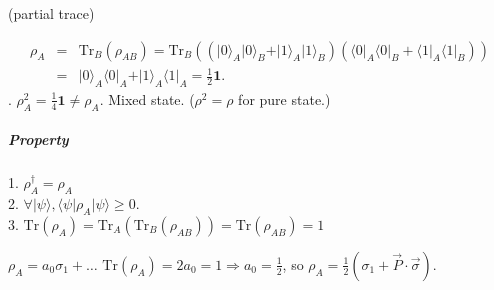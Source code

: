 \documentclass{article}
\newcommand{\Tr}{\mathrm{Tr}}
\begin{document}
\begin{CJK}{UTF8}{gkai}
\begin{spacing}{1.2}
(partial trace) 


\begin{eqnarray*}
\rho_A &=& \mathrm{Tr}_B(\rho_{AB}) = \mathrm{Tr}_B ((\vert 0\rangle_A \vert 0\rangle_B+\vert 1\rangle_A \vert 1\rangle_B)(\langle 0\vert_A \langle 0\vert_B+\langle 1\vert_A \langle 1\vert_B))\\
& = & \vert 0\rangle_A\langle 0\vert_A + \vert 1\rangle_A \langle 1\vert_A = \frac{1}{2} \mathbf{1}.
\end{eqnarray*} .
$\rho_A^2 = \frac{1}{4} \mathbf{1} \neq \rho_A$. Mixed state. ($\rho^2 = \rho$ for pure state.)

\subparagraph{Property}
1. $\rho_A^\dagger = \rho_A$\\
2. $\forall \vert \psi\rangle, \langle \psi\vert \rho_A\vert \psi\rangle\geq 0$.\\
3. $\mathrm{Tr}(\rho_A) = \mathrm{Tr}_A(\Tr_B(\rho_{AB})) = \Tr(\rho_{AB}) = 1$

$\rho_A = a_0\sigma_1 + \ldots$
$\Tr(\rho_A) = 2a_0 = 1\Rightarrow a_0 = \frac{1}{2}$, so $\rho_A = \frac{1}{2}(\sigma_1+\vec{P}\cdot \vec{\sigma})$.

\end{spacing}

\end{CJK}
\end{document}
